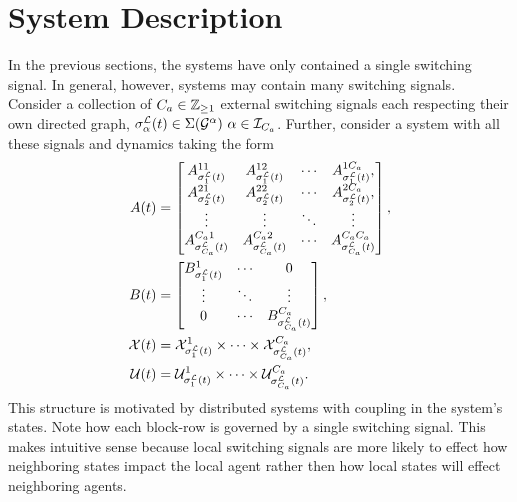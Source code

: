 
\section{System Description}
In the previous sections, the systems have only contained a single switching signal. In general, however, systems may contain many switching signals. Consider a collection of ${C_a}\in\mathbb{Z}_{\geq 1}$ external switching signals each respecting their own directed graph, $\ssl[\agentidx](t)\in\Sigma(\graph^\agentidx)\ \agentidx\in\idxset{\numagents}$. Further, consider a system with all these signals and dynamics taking the form
\begin{align}
A(t)&=\begin{bmatrix}
A^{11}_{\ssl[1](t)}&A^{12}_{\ssl[1](t)}&\cdots&A^{1\numagents}_{\ssl[1](t)},\\
A^{21}_{\ssl[2](t)}&A^{22}_{\ssl[2](t)}&\cdots&A^{2\numagents}_{\ssl[2](t)},\\
\vdots&\vdots & \ddots & \vdots\\
A^{\numagents 1}_{\ssl[\numagents](t)} & A^{\numagents 2}_{\ssl[\numagents](t)} &\cdots & A^{\numagents \numagents}_{\ssl[\numagents](t)} 
\end{bmatrix},\\
B(t)&=\begin{bmatrix}
B^{1}_{\ssl[1](t)} & \cdots & 0\\
\vdots             & \ddots & \vdots\\
0                  & \cdots & B^{\numagents}_{\ssl[\numagents](t)}
\end{bmatrix},\\
\xcon(t)&=\xcon[\ssl[1](t)]^1\times\cdots\times\xcon[\ssl[\numagents](t)]^\numagents,\\
\ucon(t)&=\ucon[\ssl[1](t)]^1\times\cdots\times\ucon[\ssl[\numagents](t)]^\numagents.
\end{align}
This structure is motivated by distributed systems with coupling in the system's states. Note how each block-row is governed by a single switching signal. This makes intuitive sense because local switching signals are more likely to effect how neighboring states impact the local agent rather then how local states will effect neighboring agents.

